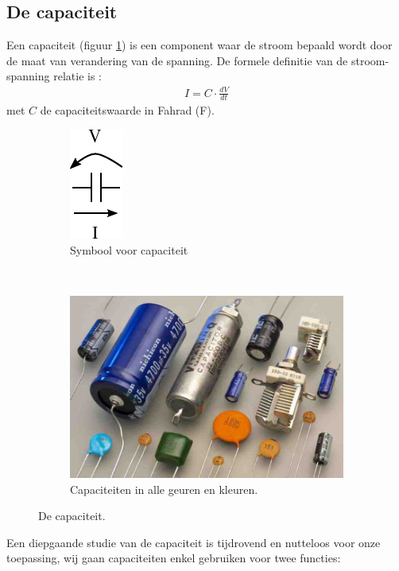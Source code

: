 \documentclass{article}
\begin{document}
		\subsection{De capaciteit}
		Een capaciteit (figuur \ref{fig:capaciteit}) is een component waar de stroom bepaald wordt door de maat van verandering van de spanning. De formele definitie van de stroom-spanning relatie is :
		\begin{align}
		    I = C \cdot \frac{dV}{dt}
		\end{align}
		met $C$ de capaciteitswaarde in Fahrad (F). 
		\begin{figure}[htbp!]
			\centering
			\begin{subfigure}[b]{0.45\linewidth}
				\centering
				\includegraphics{cap}
				\caption{Symbool voor capaciteit}
			\end{subfigure}
			~
			\begin{subfigure}[b]{0.45\linewidth}
				\centering
				\includegraphics[scale=0.6]{caps}
				\caption{Capaciteiten in alle geuren en kleuren.}
			\end{subfigure}
		\caption{De capaciteit.}
		\label{fig:capaciteit}
		\end{figure}
		Een diepgaande studie van de capaciteit is tijdrovend en nutteloos voor onze toepassing, wij gaan capaciteiten enkel  gebruiken voor twee functies:
\end{document}

